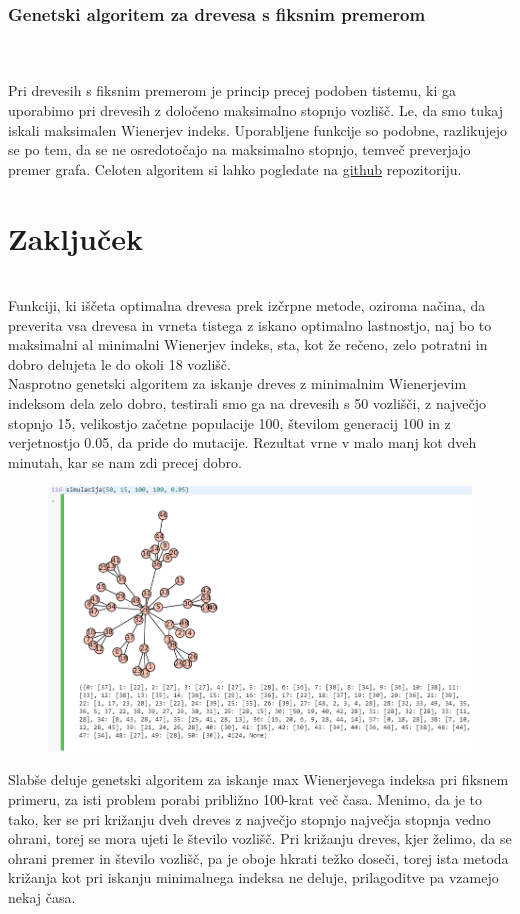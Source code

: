 \documentclass[12pt,a4paper]{amsart}
\theoremstyle{definition} %
\theoremstyle{plain} %
\begin{document}
\subsubsection{Genetski algoritem za drevesa s fiksnim premerom}
\
\\
\\
Pri drevesih s fiksnim premerom je princip precej podoben tistemu, ki ga uporabimo pri drevesih z določeno maksimalno stopnjo vozlišč. Le, da smo tukaj iskali maksimalen Wienerjev indeks.
Uporabljene funkcije so podobne, razlikujejo se po tem, da se ne osredotočajo na maksimalno stopnjo, temveč preverjajo premer grafa. Celoten algoritem si lahko pogledate na \href{https://github.com/HovnikK15/Prescribed-trees-with-max-min-Wiener-index/blob/master/Genetic%20algorithm%20for%20max%20Wiener%20index.sagews}{github} repozitoriju.
\section{Zaključek}
\
\\
Funkciji, ki iščeta optimalna drevesa prek izčrpne metode, oziroma načina, da preverita vsa drevesa in vrneta tistega
z iskano optimalno lastnostjo, naj bo to maksimalni al minimalni Wienerjev indeks, sta, kot že rečeno, zelo potratni in dobro
delujeta le do okoli 18 vozlišč. 
\\
Nasprotno genetski algoritem za iskanje dreves z minimalnim Wienerjevim indeksom dela zelo dobro, testirali smo ga na drevesih s 50 vozlišči,
z največjo stopnjo 15, velikostjo začetne populacije 100, številom generacij 100 in z verjetnostjo 0.05, da pride do mutacije. Rezultat vrne v malo manj kot dveh minutah, kar se nam zdi precej dobro.
\begin{figure}[ht]
\centering
\includegraphics[width=1\textwidth]{slika7}
\end{figure}


Slabše deluje genetski algoritem za iskanje max Wienerjevega indeksa pri fiksnem primeru, za isti problem porabi približno 100-krat več časa.
Menimo, da je to tako, ker se pri križanju dveh dreves z največjo stopnjo največja stopnja vedno ohrani, torej se mora ujeti le število vozlišč.
Pri križanju dreves, kjer želimo, da se ohrani premer in število vozlišč, pa je oboje hkrati težko doseči, torej ista metoda križanja kot pri
iskanju minimalnega indeksa ne deluje, prilagoditve pa vzamejo nekaj časa.
\end{document}
